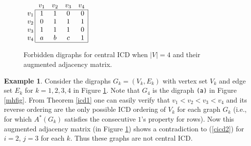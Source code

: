 \documentclass{article}
\theoremstyle{definition}
\newtheorem{exmp}[thm]{Example}
\numberwithin{equation}{section}
\begin{document}
\begin{figure}[h]
\quad\quad\quad\null
	
	\vspace{-11em}
	\null\hspace{4.9in} 
	$\begin{array}{cccccc}
	&v_{1}&v_{2}& v_{3} &v_{4}\\
	\cline{2-5}
	\multicolumn{1}{c@{\,\vline}}{v_{1}} & 1 & 1 & 0 & \multicolumn{1}{c@{\,\vline}}{0}\\
	\multicolumn{1}{c@{\,\vline}}{v_{2}} & 0 & 1 & 1 & \multicolumn{1}{c@{\,\vline}}{1}\\
	\multicolumn{1}{c@{\,\vline}}{v_{3}} & 1 & 1 & 1 & \multicolumn{1}{c@{\,\vline}}{0} \\
	\multicolumn{1}{c@{\,\vline}}{v_{4}} & a & b & c & \multicolumn{1}{c@{\,\vline}}{1}\\
	\cline{2-5}
	\end{array}$
	
	\vspace{3em}
	\caption{Forbidden digraphs for central ICD when $|V|=4$ and their augmented adjacency matrix.}\label{forbid11}		
\end{figure}	

\begin{exmp}\label{notcicd}
Consider the digraphs $G_k=(V_k,E_k)$ with vertex set $V_k$ and edge set $E_{k}$ for $k=1,2,3,4$ in Figure \ref{forbid11}. Note that $G_4$ is the digraph {\tt (a)} in Figure \ref{mhfig}. From Theorem \ref{icd1} one can easily verify that $v_1<v_2<v_3<v_4$ and its reverse ordering are the only possible ICD ordering of $V_k$ for each graph $G_k$ (i.e., for which $A^*(G_k)$ satisfies the consecutive $1$'s property for rows). Now this augmented adjacency matrix (in Figure \ref{forbid11}) shows a contradiction to (\ref{cicd2}) for $i=2$, $j=3$ for each $k$. Thus these graphs are not central ICD.  
\end{exmp} 
\end{document}
